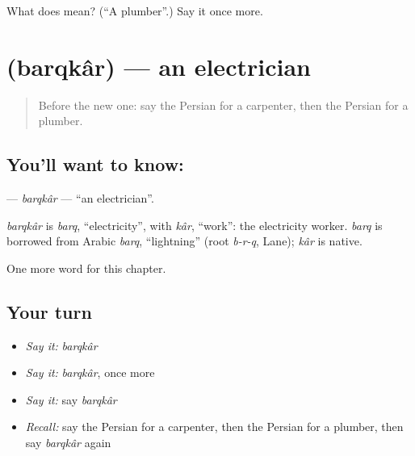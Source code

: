 \begin{tcolorbox}[breakable,colback=teal!4,colframe=teal!35!black,title={Before you move on}]
What does   mean? (\textquotedblleft{}A plumber\textquotedblright{}.) Say it once more.
\end{tcolorbox}
\section[\texorpdfstring{\fa{برقکار} (barqkâr)}{برقکار (barqkâr)}]{ (barqkâr) — an electrician}

\label{lesson:FA-C216-barqkar}



\begin{quote}
Before the new one: say the Persian for a carpenter, then the Persian for a plumber.
\end{quote}

\subsection*{You'll want to know: }
\textbf{} — \emph{barqkâr} — \textquotedblleft{}an electrician\textquotedblright{}.

\begin{cousinweb}
\emph{barqkâr} is \emph{barq}, \textquotedblleft{}electricity\textquotedblright{}, with \emph{kâr}, \textquotedblleft{}work\textquotedblright{}: the electricity worker. \emph{barq} is borrowed from Arabic \emph{barq}, \textquotedblleft{}lightning\textquotedblright{} (root \emph{b-r-q}, Lane); \emph{kâr} is native.
\end{cousinweb}

\begin{grammarlens}[title={What you've built}]
One more word for this chapter.
\end{grammarlens}

\subsection*{Your turn}
\begin{itemize}
\raggedright
  \item \emph{Say it:} \emph{barqkâr}
  \item \emph{Say it:} \emph{barqkâr}, once more
  \item \emph{Say it:} say \emph{barqkâr}
  \item \emph{Recall:} say the Persian for a carpenter, then the Persian for a plumber, then say \emph{barqkâr} again
\end{itemize}

